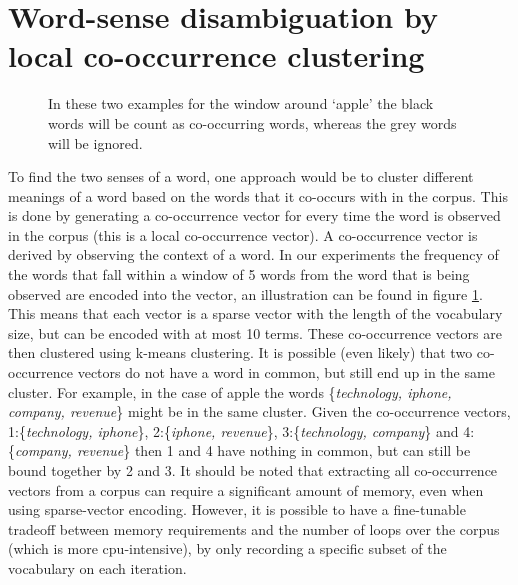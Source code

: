 \documentclass[11pt]{article}
\begin{document}
\section{Word-sense disambiguation by local co-occurrence clustering}
\label{remi}
\begin{figure}
\center
{}

\caption{In these two examples for the window around `apple' the black words will be count as co-occurring words, whereas the grey words will be ignored.}
\label{window}
\end{figure}

To find the two senses of a word, one approach would be to cluster different meanings of a word based on the words that it co-occurs with in the corpus. This is done by generating a co-occurrence vector for every time the word is observed in the corpus (this is a local co-occurrence vector). A co-occurrence vector is derived by observing the context of a word. In our experiments the frequency of the words that fall within a window of 5 words from the word that is being observed are encoded into the vector, an illustration can be found in figure \ref{window}. This means that each vector is a sparse vector with the length of the vocabulary size, but can be encoded with at most 10 terms. These co-occurrence vectors are then clustered using k-means clustering. It is possible (even likely) that two co-occurrence vectors do not have a word in common, but still end up in the same cluster. For example, in the case of apple the words \{\textit{technology, iphone, company, revenue}\} might be in the same cluster. Given the co-occurrence vectors, 1:\{\textit{technology, iphone}\}, 2:\{\textit{iphone, revenue}\}, 3:\{\textit{technology, company}\} and 4:\{\textit{company, revenue}\} then 1 and 4 have nothing in common, but can still be bound together by 2 and 3. It should be noted that extracting all co-occurrence vectors from a corpus can require a significant amount of memory, even when using sparse-vector encoding. However, it is possible to have a fine-tunable tradeoff between memory requirements and the number of loops over the corpus (which is more cpu-intensive), by only recording a specific subset of the vocabulary on each iteration.
\end{document}
